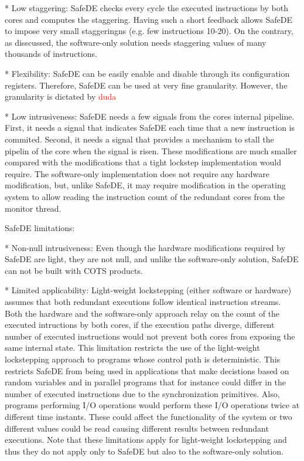 * Low staggering: SafeDE checks every cycle the executed instructions by both cores and computes the staggering. Having such a short feedback allows SafeDE to impose very small staggeringns (e.g. few instructions 10-20). On the contrary, as disscussed, the software-only solution needs staggering values of many thousands of instructions.

* Flexibility: SafeDE can be easily enable and disable through its configuration registers. Therefore, SafeDE can be used at very fine granularity. However, the granularity is dictated by \textcolor{red}{duda}

* Low intrusiveness: SafeDE needs a few signals from the cores internal pipeline. First, it needs a signal that indicates SafeDE each time that a new instruction is commited. Second, it needs a signal that provides a mechanism to stall the pipelin of the core when the signal is risen. These modifications are much smaller compared with the modifications that a tight lockstep implementation would require. The software-only implementation does not require any hardware modification, but, unlike SafeDE, it may require modification in the operating system to allow reading the instruction count of the redundant cores from the monitor thread. 



SafeDE limitations:

* Non-null intrusiveness: Even though the hardware modifications required by SafeDE are light, they are not null, and unlike the software-only solution, SafeDE can not be built with COTS products.

* Limited applicability: Light-weight lockstepping (either software or hardware)  assumes that both redundant executions follow identical instruction streams. Both the hardware and the software-only approach relay on the count of the executed intructions by both cores, if the execution paths diverge, different number of executed instructions would not prevent both cores from exposing the same internal state. This limitation restricts the use of the light-weight lockstepping approach to programs whose control path is deterministic. This restricts SafeDE from being used in applications that make decistions based on random variables and in parallel programs that for instance could differ in the number of executed instructions due to the synchronization primitives. Also, programs performing I/O operations would perform these I/O operations twice at different time instants. These could affect the functionality of the system or two different values could be read causing different results between redundant executions. Note that these limitations apply for light-weight lockstepping and thus they do not apply only to SafeDE but also to the software-only solution.

